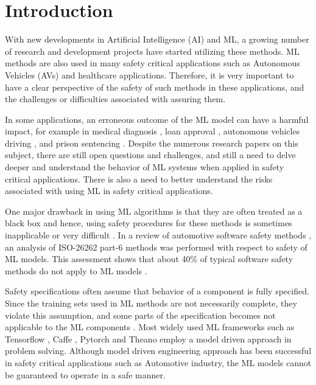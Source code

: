\chapter{Introduction}

With new developments in Artificial Intelligence (AI) and ML, a growing number of research and development projects have started utilizing these methods.
ML methods are also used in many safety critical applications such as Autonomous Vehicles (AVs) and healthcare applications. Therefore, it is very important to have a clear perspective of the safety of such methods in these applications, and the challenges or difficulties associated with assuring them.

In some applications, an erroneous outcome of the ML model can have a harmful impact, for example in medical diagnosis \cite{Foster2014}, loan approval \cite{Lessmann2015}, autonomous vehicles driving \cite{koopman2016challenges}, and prison sentencing \cite{Berk2015}.
Despite the numerous research papers on this subject, there are still open questions and challenges, and still a need to delve deeper and understand the behavior of ML systems when applied in safety critical applications. There is also a need to better understand the risks associated with using ML in safety critical applications.

One major drawback in using ML algorithms is that they are often treated as a black box and hence, using safety procedures for these methods is sometimes inapplicable or very difficult \cite{Schwalbe2020}. In a review of automotive software safety methods \cite{Salay2017}, an analysis of ISO-26262 part-6 methods was performed with respect to safety of ML models. This assessment shows that about 40\% of typical software safety methods do not apply to ML models \cite{Salay2017}.


Safety specifications often assume that behavior of a component is fully specified. Since the training sets used in ML methods are not necessarily complete, they violate this assumption, and some parts of the specification becomes not applicable to the ML components \cite{Salay2017}. 
Most widely used ML frameworks such as Tensorflow \cite{Abadi2016Tensor}, Caffe \cite{Caffe2014}, Pytorch \cite{pytorch2019} and Theano \cite{Al-Rfou} employ a model driven approach in problem solving. Although model driven engineering approach has been successful in safety critical applications such as Automotive industry, the ML models cannot be guaranteed to operate in a safe manner. 

